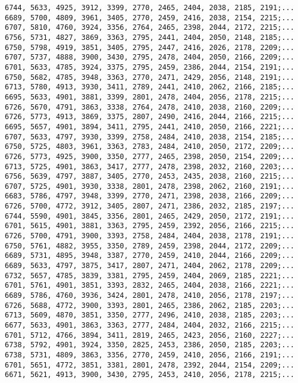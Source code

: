 \begin{verbatim}
6744, 5633, 4925, 3912, 3399, 2770, 2465, 2404, 2038, 2185, 2191;...
6689, 5700, 4809, 3961, 3405, 2770, 2459, 2416, 2038, 2154, 2215;...
6707, 5810, 4760, 3924, 3356, 2764, 2465, 2398, 2044, 2172, 2215;...
6756, 5731, 4827, 3869, 3363, 2795, 2441, 2404, 2050, 2148, 2185;...
6750, 5798, 4919, 3851, 3405, 2795, 2447, 2416, 2026, 2178, 2209;...
6707, 5737, 4888, 3900, 3430, 2795, 2478, 2404, 2050, 2166, 2209;...
6701, 5633, 4785, 3924, 3375, 2795, 2459, 2386, 2044, 2154, 2191;...
6750, 5682, 4785, 3948, 3363, 2770, 2471, 2429, 2056, 2148, 2191;...
6713, 5780, 4913, 3930, 3411, 2789, 2441, 2410, 2062, 2166, 2185;...
6695, 5633, 4901, 3881, 3399, 2801, 2478, 2404, 2056, 2178, 2215;...
6726, 5670, 4791, 3863, 3338, 2764, 2478, 2410, 2038, 2160, 2209;...
6726, 5773, 4913, 3869, 3375, 2807, 2490, 2416, 2044, 2166, 2215;...
6695, 5657, 4901, 3894, 3411, 2795, 2441, 2410, 2050, 2166, 2221;...
6707, 5633, 4797, 3930, 3399, 2758, 2484, 2410, 2038, 2154, 2185;...
6750, 5725, 4803, 3961, 3363, 2783, 2484, 2410, 2050, 2172, 2209;...
6726, 5773, 4925, 3900, 3350, 2777, 2465, 2398, 2050, 2154, 2209;...
6713, 5725, 4901, 3863, 3417, 2777, 2478, 2398, 2032, 2160, 2203;...
6756, 5639, 4797, 3887, 3405, 2770, 2453, 2435, 2038, 2160, 2215;...
6707, 5725, 4901, 3930, 3338, 2801, 2478, 2398, 2062, 2160, 2191;...
6683, 5786, 4797, 3948, 3399, 2770, 2471, 2398, 2038, 2166, 2209;...
6726, 5700, 4772, 3912, 3405, 2807, 2471, 2386, 2032, 2185, 2197;...
6744, 5590, 4901, 3845, 3356, 2801, 2465, 2429, 2050, 2172, 2191;...
6701, 5615, 4901, 3881, 3363, 2795, 2459, 2392, 2056, 2166, 2215;...
6726, 5700, 4791, 3900, 3393, 2758, 2484, 2404, 2038, 2178, 2191;...
6750, 5761, 4882, 3955, 3350, 2789, 2459, 2398, 2044, 2172, 2209;...
6689, 5731, 4895, 3948, 3387, 2770, 2459, 2410, 2044, 2166, 2209;...
6689, 5633, 4797, 3875, 3417, 2807, 2471, 2404, 2062, 2178, 2209;...
6732, 5657, 4785, 3839, 3381, 2795, 2459, 2404, 2069, 2185, 2221;...
6701, 5761, 4901, 3851, 3393, 2832, 2465, 2404, 2038, 2166, 2221;...
6689, 5786, 4760, 3936, 3424, 2801, 2478, 2410, 2056, 2178, 2197;...
6726, 5688, 4772, 3900, 3393, 2801, 2465, 2386, 2062, 2185, 2203;...
6713, 5609, 4870, 3851, 3350, 2777, 2496, 2410, 2038, 2185, 2203;...
6677, 5633, 4901, 3863, 3363, 2777, 2484, 2404, 2032, 2166, 2215;...
6701, 5712, 4766, 3894, 3411, 2819, 2465, 2423, 2056, 2160, 2227;...
6738, 5792, 4901, 3924, 3350, 2825, 2453, 2386, 2050, 2185, 2203;...
6738, 5731, 4809, 3863, 3356, 2770, 2459, 2410, 2056, 2166, 2191;...
6701, 5651, 4772, 3851, 3381, 2801, 2478, 2392, 2044, 2154, 2209;...
6671, 5621, 4913, 3900, 3430, 2795, 2453, 2410, 2056, 2178, 2215;...

\end{verbatim}
